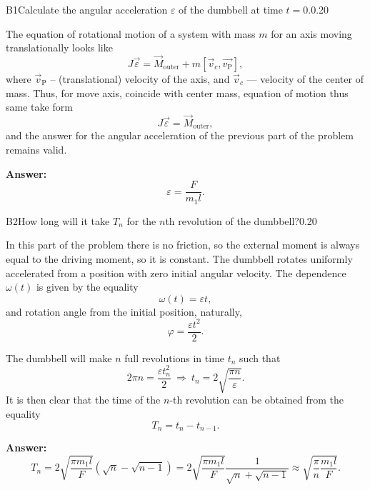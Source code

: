 \documentclass[11pt,a4paper]{article}
\begin{document}
\begin{solcard}{B1}{Calculate the angular acceleration $\varepsilon$ of the dumbbell at time $t = 0$.}{0.20}

The equation of rotational motion of a system with mass $m$ for an axis moving translationally looks like $$J\vec{\varepsilon} = \vec{M}_{\text{outer}}  + m\left[\vec{v}_c, \vec{v_{\mathrm{P}}}\right],$$where $\vec{v}_{\text{P}}$ -- (translational) velocity of the axis, and $\vec{v}_c$ — velocity of the center of mass. Thus, for move axis, coincide with center mass, equation of motion thus same take form $$J\vec{\varepsilon} = \vec{M}_{\text{outer}},$$ and the answer for the angular acceleration of the previous part of the problem remains valid.

\par\smallskip\noindent\textbf{Answer:} $$\varepsilon = \frac{F}{m_1 l}.$$
\end{solcard}

\begin{solcard}{B2}{How long will it take $T_n$ for the $n$th revolution of the dumbbell?}{0.20}

In this part of the problem there is no friction, so the external moment is always equal to the driving moment, so it is constant. The dumbbell rotates uniformly accelerated from a position with zero initial angular velocity. The dependence $\omega(t)$ is given by the equality $$\omega(t) = \varepsilon t,$$ and rotation angle from the initial position, naturally, $$\varphi = \frac{\varepsilon t^2}{2}.$$


The dumbbell will make $n$ full revolutions in time $t_n$ such that $$2\pi n = \frac{\varepsilon t_n^2}{2}~\Rightarrow~t_n = 2\sqrt{\frac{\pi n}{\varepsilon}}.$$It is then clear that the time of the $n$-th revolution can be obtained from the equality $$T_n = t_n - t_{n-1}.$$

\par\smallskip\noindent\textbf{Answer:} $$T_n = 2\sqrt{\frac{\pi m_1 l}{F}}\left(\sqrt{n} - \sqrt{n-1}\right) = 2\sqrt{\frac{\pi m_1 l}{F}} \frac{1}{\sqrt{n} + \sqrt{n-1}} \approx \sqrt{\frac{\pi}{n}\frac{m_1l}F{}}.$$
\end{solcard}
\end{document}
